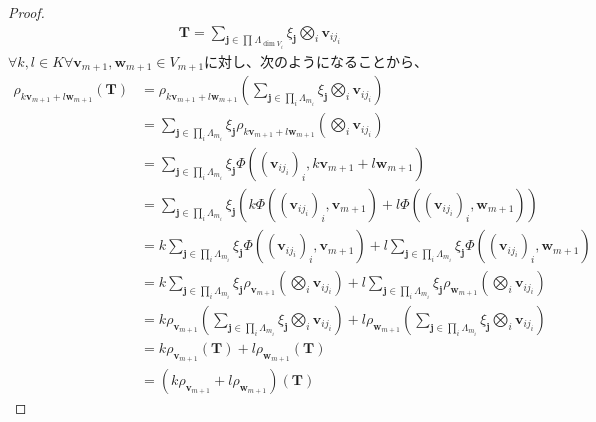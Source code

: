 \documentclass[dvipdfmx]{jsarticle}
\begin{document}
\begin{proof}
\begin{align*}
\mathbf{T} = \sum_{\mathbf{j}\in \prod_{} \varLambda_{\dim V_{i}}} {\xi_{\mathbf{j}}\bigotimes_{i} \mathbf{v}_{ij_{i}}}
\end{align*}
$\forall k,l \in K\forall\mathbf{v}_{m + 1},\mathbf{w}_{m + 1} \in V_{m + 1}$に対し、次のようになることから、
\begin{align*}
\rho_{k\mathbf{v}_{m + 1} + l\mathbf{w}_{m + 1}}\left( \mathbf{T} \right) &= \rho_{k\mathbf{v}_{m + 1} + l\mathbf{w}_{m + 1}}\left( \sum_{\mathbf{j} \in \prod_{i} \varLambda_{m_{i}}} {\xi_{\mathbf{j}}\bigotimes_{i} \mathbf{v}_{ij_{i}}} \right)\\
&= \sum_{\mathbf{j} \in \prod_{i} \varLambda_{m_{i}}} {\xi_{\mathbf{j}}\rho_{k\mathbf{v}_{m + 1} + l\mathbf{w}_{m + 1}}\left( \bigotimes_{i} \mathbf{v}_{ij_{i}} \right)}\\
&= \sum_{\mathbf{j} \in \prod_{i} \varLambda_{m_{i}}} {\xi_{\mathbf{j}}\varPhi\left( \left( \mathbf{v}_{ij_{i}} \right)_{i},k\mathbf{v}_{m + 1} + l\mathbf{w}_{m + 1} \right)}\\
&= \sum_{\mathbf{j} \in \prod_{i} \varLambda_{m_{i}}} {\xi_{\mathbf{j}}\left( k\varPhi\left( \left( \mathbf{v}_{ij_{i}} \right)_{i},\mathbf{v}_{m + 1} \right) + l\varPhi\left( \left( \mathbf{v}_{ij_{i}} \right)_{i},\mathbf{w}_{m + 1} \right) \right)}\\
&= k\sum_{\mathbf{j} \in \prod_{i} \varLambda_{m_{i}}} {\xi_{\mathbf{j}}\varPhi\left( \left( \mathbf{v}_{ij_{i}} \right)_{i},\mathbf{v}_{m + 1} \right)} + l\sum_{\mathbf{j} \in \prod_{i} \varLambda_{m_{i}}} {\xi_{\mathbf{j}}\varPhi\left( \left( \mathbf{v}_{ij_{i}} \right)_{i},\mathbf{w}_{m + 1} \right)}\\
&= k\sum_{\mathbf{j} \in \prod_{i} \varLambda_{m_{i}}} {\xi_{\mathbf{j}}\rho_{\mathbf{v}_{m + 1}}\left( \bigotimes_{i} \mathbf{v}_{ij_{i}} \right)} + l\sum_{\mathbf{j} \in \prod_{i} \varLambda_{m_{i}}} {\xi_{\mathbf{j}}\rho_{\mathbf{w}_{m + 1}}\left( \bigotimes_{i} \mathbf{v}_{ij_{i}} \right)}\\
&= k\rho_{\mathbf{v}_{m + 1}}\left( \sum_{\mathbf{j} \in \prod_{i} \varLambda_{m_{i}}} {\xi_{\mathbf{j}}\bigotimes_{i} \mathbf{v}_{ij_{i}}} \right) + l\rho_{\mathbf{w}_{m + 1}}\left( \sum_{\mathbf{j} \in \prod_{i} \varLambda_{m_{i}}} {\xi_{\mathbf{j}}\bigotimes_{i} \mathbf{v}_{ij_{i}}} \right)\\
&= k\rho_{\mathbf{v}_{m + 1}}\left( \mathbf{T} \right) + l\rho_{\mathbf{w}_{m + 1}}\left( \mathbf{T} \right)\\
&= \left( k\rho_{\mathbf{v}_{m + 1}} + l\rho_{\mathbf{w}_{m + 1}} \right)\left( \mathbf{T} \right)

\end{align*}
\end{proof}
\end{document}

